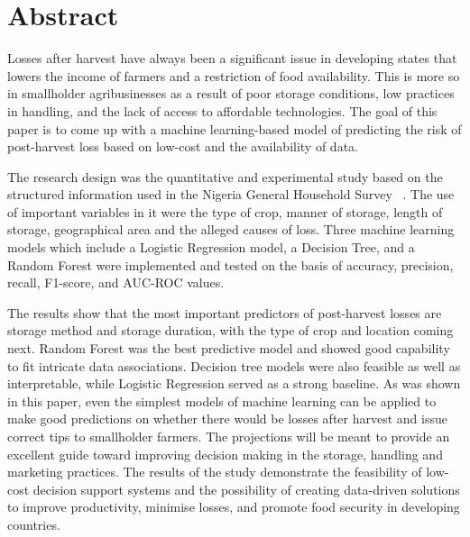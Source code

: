 \chapter*{Abstract}

Losses after harvest have always been a significant issue in developing states that lowers the income
of farmers and a restriction of food availability. This is more so in smallholder agribusinesses as a
result of poor storage conditions, low practices in handling, and the lack of access to affordable
technologies. The goal of this paper is to come up with a machine learning-based model of predicting
the risk of post-harvest loss based on low-cost and the availability of data.

The research design was the quantitative and experimental study based on the structured information
used in the Nigeria General Household Survey ~\cite{ghspanel2024nigeria}. The use of important
variables in it were the type of crop, manner of storage, length of storage, geographical area and
the alleged causes of loss. Three machine learning models which include a Logistic Regression model,
a Decision Tree, and a Random Forest were implemented and tested on the basis of accuracy, precision,
recall, F1-score, and AUC-ROC values.

The results show that the most important predictors of post-harvest losses are storage method and
storage duration, with the type of crop and location coming next. Random Forest was the best
predictive model and showed good capability to fit intricate data associations. Decision tree models
were also feasible as well as interpretable, while Logistic Regression served as a strong baseline.
As was shown in this paper, even the simplest models of machine learning can be applied to make good
predictions on whether there would be losses after harvest and issue correct tips to smallholder
farmers. The projections will be meant to provide an excellent guide toward improving decision making
in the storage, handling and marketing practices. The results of the study demonstrate the feasibility
of low-cost decision support systems and the possibility of creating data-driven solutions to improve
productivity, minimise losses, and promote food security in developing countries.

